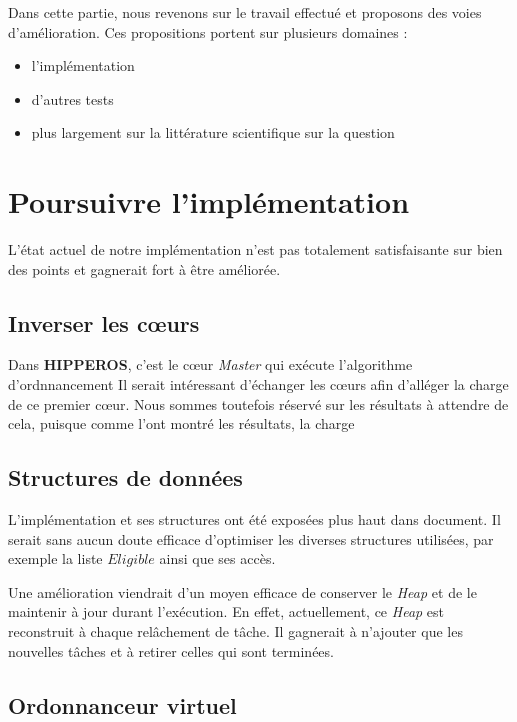 Dans cette partie, nous revenons sur le travail effectué et proposons des voies d'amélioration.
Ces propositions portent sur plusieurs domaines :
\begin{itemize}
	\item l'implémentation
	\item d'autres tests
	\item plus largement sur la littérature scientifique sur la question
\end{itemize}

\section{Poursuivre l'implémentation}

	L'état actuel de notre implémentation n'est pas totalement satisfaisante sur bien des points et 
	gagnerait fort à être améliorée. 
	
	\subsection{Inverser les cœurs}
		Dans \textbf{HIPPEROS}, c'est le cœur \textit{Master} qui exécute l'algorithme d'ordnnancement 
		Il serait intéressant d'échanger les cœurs afin d'alléger la charge de ce premier cœur. 
		Nous sommes toutefois réservé sur les résultats à attendre de cela, 
		puisque comme l'ont montré les résultats, la charge 
	
	\subsection{Structures de données}
		L'implémentation et ses structures ont été exposées plus haut dans document. 
		Il serait sans aucun doute efficace d'optimiser les diverses structures utilisées, par exemple 
		la liste $Eligible$ ainsi que ses accès. \newline
		
		Une amélioration viendrait d'un moyen efficace de conserver le \textit{Heap} et de le maintenir 
		à jour durant l'exécution. En effet, actuellement, ce \textit{Heap} est reconstruit à chaque 
		relâchement de tâche. Il gagnerait à n'ajouter que les nouvelles tâches et à retirer celles qui sont terminées.

	\subsection{Ordonnanceur virtuel}
	
